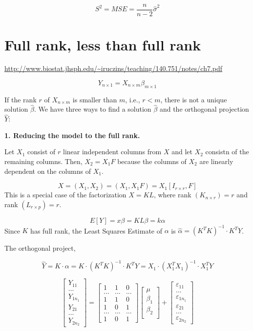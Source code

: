 \documentclass[]{book}
\begin{document}
\[S^2=MSE=\frac{n}{n-2}\hat{\sigma}^2\]

\hypertarget{full-rank-less-than-full-rank}{%
\section{Full rank, less than full rank}\label{full-rank-less-than-full-rank}}

\url{http://www.biostat.jhsph.edu/~iruczins/teaching/140.751/notes/ch7.pdf}

\[Y_{n \times 1}=X_{n\times m}\beta_{m \times 1}\]

If the rank \(r\) of \(X_{n \times m}\) is smaller than \(m\), i.e., \(r<m\), there is not a unique solution \(\hat{\beta}\). We have three ways to find a solution \(\hat{\beta}\) and the orthogonal projection \(\hat{Y}\):

\textbf{1. Reducing the model to the full rank.}

Let \(X_1\) consist of \(r\) linear independent columns from \(X\) and let \(X_2\) consistn of the remaining columns. Then, \(X_2=X_1F\) because the columns of \(X_2\) are linearly dependent on the columns of \(X_1\).

\[X=(X_1, X_2)=(X_1, X_1F)=X_1[I_{r\times r}, F]\]
This is a special case of the factorization \(X=KL\), where rank \((K_{n \times r})=r\) and rank \((L_{r\times p})=r\).

\[E[Y]=x\beta=KL\beta=k\alpha\]
Since \(K\) has full rank, the Least Squares Estimate of \(\alpha\) is \(\hat{\alpha}=(K^T K)^{-1} \cdot K^TY\).

The orthogonal project,

\[\hat{Y}=K\cdot \alpha=K \cdot(K^T K)^{-1} \cdot K^TY=X_1 \cdot(X_1^TX_1)^{-1}\cdot X_1^TY\]

\[\begin{bmatrix}
Y_{11} \\ ... \\ Y_{1n_1} \\
Y_{21}  \\ ... \\ Y_{2n_2} \end{bmatrix}=
\begin{bmatrix}
1 & 1 & 0\\
... & ... & ... \\
1 & 1 & 0 \\
1 & 0 & 1 \\ 
... & ... & ... \\
1 & 0 &1 \end{bmatrix} 
\begin{bmatrix}
\mu \\
\beta_1  \\
\beta_2\\
\end{bmatrix}+\begin{bmatrix}
\varepsilon_{11} \\ ... \\ \varepsilon_{1n_1} \\
\varepsilon_{21}  \\ ... \\ \varepsilon_{2n_2}  \end{bmatrix}\]
\end{document}
